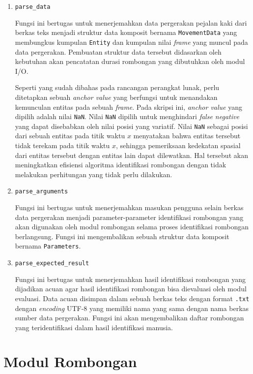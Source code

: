 \begin{enumerate}
    \item \texttt{parse\_data}
    
    Fungsi ini bertugas untuk menerjemahkan data pergerakan pejalan kaki dari berkas teks menjadi struktur data komposit bernama \texttt{MovementData} yang membungkus kumpulan \texttt{Entity} dan kumpulan nilai \textit{frame} yang muncul pada data pergerakan. Pembuatan struktur data tersebut didasarkan oleh kebutuhan akan pencatatan durasi rombongan yang dibutuhkan oleh modul I/O.
    
    Seperti yang sudah dibahas pada rancangan perangkat lunak, perlu ditetapkan sebuah \textit{anchor value} yang berfungsi untuk menandakan kemunculan entitas pada sebuah \textit{frame}. Pada skripsi ini, \textit{anchor value} yang dipilih adalah nilai \texttt{NaN}. Nilai \texttt{NaN} dipilih untuk menghindari \textit{false negative} yang dapat disebabkan oleh nilai posisi yang variatif. Nilai \texttt{NaN} sebagai posisi dari sebuah entitas pada titik waktu $x$ menyatakan bahwa entitas tersebut tidak terekam pada titik waktu $x$, sehingga pemeriksaan kedekatan spasial dari entitas tersebut dengan entitas lain dapat dilewatkan. Hal tersebut akan meningkatkan efisiensi algoritma identifikasi rombongan dengan tidak melakukan perhitungan yang tidak perlu dilakukan. 
    
    \item \texttt{parse\_arguments}
    
    Fungsi ini bertugas untuk menerjemahkan masukan pengguna selain berkas data pergerakan menjadi parameter-parameter identifikasi rombongan yang akan digunakan oleh modul rombongan selama proses identifikasi rombongan berlangsung. Fungsi ini mengembalikan sebuah struktur data komposit bernama \texttt{Parameters}.
    
    \item \texttt{parse\_expected\_result}
    
    Fungsi ini bertugas untuk menerjemahkan hasil identifikasi rombongan yang dijadikan acuan agar hasil identifikasi rombongan bisa dievaluasi oleh modul evaluasi. Data acuan disimpan dalam sebuah berkas teks dengan format \texttt{.txt} dengan \textit{encoding} UTF-8 yang memiliki nama yang sama dengan nama berkas sumber data pergerakan. Fungsi ini akan mengembalikan daftar rombongan yang teridentifikasi dalam hasil identifikasi manusia.
\end{enumerate}

\section{Modul Rombongan}
\label{sec:impl-rombongan}

